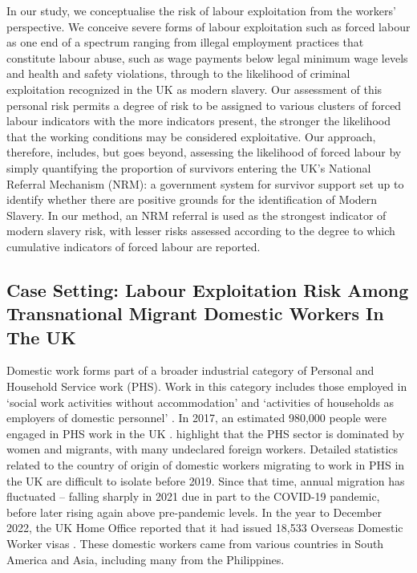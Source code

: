 \documentclass[
  12pt,
  letterpaper,
  DIV=11,
  numbers=noendperiod]{scrartcl}
\theoremstyle{plain}
\theoremstyle{definition}
\begin{document}
In our study, we conceptualise the risk of labour exploitation from the
workers' perspective. We conceive severe forms of labour exploitation
such as forced labour as one end of a spectrum ranging from illegal
employment practices that constitute labour abuse, such as wage payments
below legal minimum wage levels and health and safety violations,
through to the likelihood of criminal exploitation recognized in the UK
as modern slavery. Our assessment of this personal risk permits a degree
of risk to be assigned to various clusters of forced labour indicators
with the more indicators present, the stronger the likelihood that the
working conditions may be considered exploitative. Our approach,
therefore, includes, but goes beyond, assessing the likelihood of forced
labour by simply quantifying the proportion of survivors entering the
UK's National Referral Mechanism (NRM): a government system for survivor
support set up to identify whether there are positive grounds for the
identification of Modern Slavery. In our method, an NRM referral is used
as the strongest indicator of modern slavery risk, with lesser risks
assessed according to the degree to which cumulative indicators of
forced labour are reported.

\subsection{Case Setting: Labour Exploitation Risk Among Transnational
Migrant Domestic Workers In The
UK}\label{case-setting-labour-exploitation-risk-among-transnational-migrant-domestic-workers-in-the-uk}

Domestic work forms part of a broader industrial category of Personal
and Household Service work (PHS). Work in this category includes those
employed in `social work activities without accommodation' and
`activities of households as employers of domestic personnel'
\autocite{european_commission_staff_2012}. In 2017, an estimated 980,000
people were engaged in PHS work in the UK
\autocite{manoudi_analysis_2018}. \textcite{manoudi_analysis_2018}
highlight that the PHS sector is dominated by women and migrants, with
many undeclared foreign workers. Detailed statistics related to the
country of origin of domestic workers migrating to work in PHS in the UK
are difficult to isolate before 2019. Since that time, annual migration
has fluctuated -- falling sharply in 2021 due in part to the COVID-19
pandemic, before later rising again above pre-pandemic levels. In the
year to December 2022, the UK Home Office reported that it had issued
18,533 Overseas Domestic Worker visas \autocite{home_office_why_2023}.
These domestic workers came from various countries in South America and
Asia, including many from the Philippines.
\end{document}

